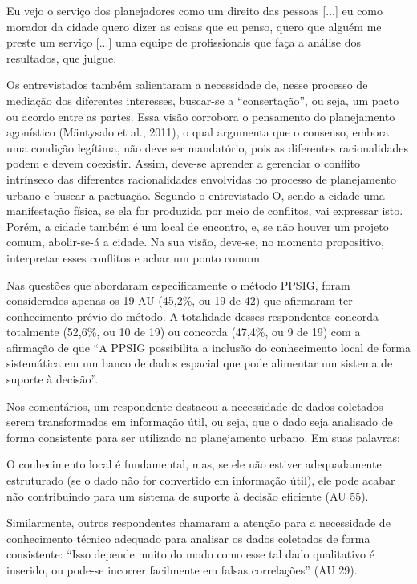 \documentclass{article}
\begin{document}
Eu vejo o serviço dos planejadores como um direito das pessoas
[...] eu como morador da cidade quero dizer as coisas
que eu penso, quero que alguém me preste um serviço [...]
uma equipe de profissionais que faça a análise dos resultados, que
julgue.

Os entrevistados também salientaram a necessidade de, nesse processo de mediação
dos diferentes interesses, buscar-se a “consertação”, ou seja, um pacto ou
acordo entre as partes. Essa visão corrobora o pensamento do planejamento
agonístico (Mäntysalo et al., 2011), o
qual argumenta que o consenso, embora uma condição legítima, não deve ser
mandatório, pois as diferentes racionalidades podem e devem coexistir. Assim,
deve-se aprender a gerenciar o conflito intrínseco das diferentes racionalidades
envolvidas no processo de planejamento urbano e buscar a pactuação. Segundo o
entrevistado O, sendo a cidade uma manifestação física, se ela for produzida por
meio de conflitos, vai expressar isto. Porém, a cidade também é um local de
encontro, e, se não houver um projeto comum, abolir-se-á a cidade. Na sua visão,
deve-se, no momento propositivo, interpretar esses conflitos e achar um ponto
comum.

Nas questões que abordaram especificamente o método PPSIG, foram considerados
apenas os 19 AU (45,2\%, ou 19 de 42) que afirmaram ter conhecimento prévio do
método. A totalidade desses respondentes concorda totalmente (52,6\%, ou 10 de
19) ou concorda (47,4\%, ou 9 de 19) com a afirmação de que “A PPSIG
possibilita a inclusão do conhecimento local de forma sistemática em um
banco de dados espacial que pode alimentar um sistema de suporte à
decisão”.

Nos comentários, um respondente destacou a necessidade de dados coletados serem
transformados em informação útil, ou seja, que o dado seja analisado de forma
consistente para ser utilizado no planejamento urbano. Em suas palavras:

O conhecimento local é fundamental, mas, se ele não estiver adequadamente
estruturado (se o dado não for convertido em informação útil), ele pode
acabar não contribuindo para um sistema de suporte à decisão eficiente
(AU 55).

Similarmente, outros respondentes chamaram a atenção para a necessidade de
conhecimento técnico adequado para analisar os dados coletados de forma
consistente: “Isso depende muito do modo como esse tal dado qualitativo
é inserido, ou pode-se incorrer facilmente em falsas correlações”
(AU 29).
\end{document}
